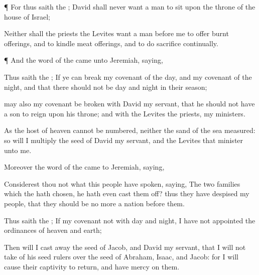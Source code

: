 {\par }{\PP {}¶ For thus
saith the
{};
David shall
never
want a
man to
sit upon the
throne of the
house of
Israel;

Neither shall the
priests the
Levites
want a
man
before me to
offer burnt
offerings, and to
kindle meat
offerings, and to
do
sacrifice
continually.


\par }{\PP {}¶ And the
word of the
{} came unto
Jeremiah,
saying,

Thus
saith the
{}; If ye can
break my
covenant of the
day, and my
covenant of the
night, and that there should not be
day and
night in their
season;

 may also my
covenant be
broken with
David my
servant, that he should not have a
son to
reign upon his
throne; and with the
Levites the
priests, my
ministers.

As the
host of
heaven cannot be
numbered, neither the
sand of the
sea
measured: so will I
multiply the
seed of
David my
servant, and the
Levites that
minister unto me.

Moreover the
word of the
{} came to
Jeremiah,
saying,

Considerest thou not what this
people have
spoken,
saying, The
two
families which the
{} hath
chosen, he hath even cast them
off? thus they have
despised my
people, that they should be no more a
nation
before them.

Thus
saith the
{}; If my
covenant
{} not with
day and
night,
{} I have not
appointed the
ordinances of
heaven and
earth;

Then will I cast
away the
seed of
Jacob, and
David my
servant,
{} that I will not
take
{} of his
seed
{}
rulers over the
seed of
Abraham,
Isaac, and
Jacob: for I will cause their
captivity to
return, and have
mercy on them.




\par }

